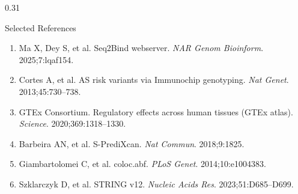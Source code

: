 \documentclass[final]{beamer}
\begin{document}
\begin{frame}[t]
\begin{columns}[t,onlytextwidth]
\begin{column}{0.31\textwidth}
\begin{block}{Selected References}
\begin{enumerate}\setlength{\itemsep}{0pt}\setlength{\parsep}{0pt}\setlength{\topsep}{0pt}\setlength{\leftskip}{-1.2em}
  \item Ma X, Dey S, et al. Seq2Bind webserver. \textit{NAR Genom Bioinform}. 2025;7:lqaf154.
  \item Cortes A, et al. AS risk variants via Immunochip genotyping. \textit{Nat Genet}. 2013;45:730--738.
  \item GTEx Consortium. Regulatory effects across human tissues (GTEx atlas). \textit{Science}. 2020;369:1318--1330.
  \item Barbeira AN, et al. S-PrediXcan. \textit{Nat Commun}. 2018;9:1825.
  \item Giambartolomei C, et al. coloc.abf. \textit{PLoS Genet}. 2014;10:e1004383.
  \item Szklarczyk D, et al. STRING v12. \textit{Nucleic Acids Res}. 2023;51:D685--D699.
\end{enumerate}
\end{block}


\end{column}

\end{columns}

\end{frame}
\end{document}
